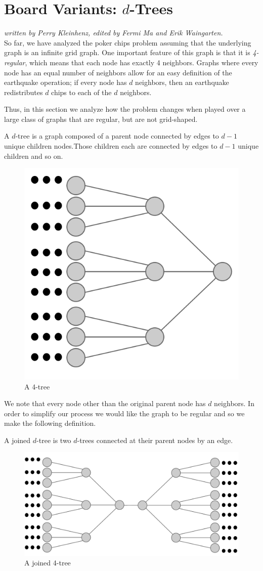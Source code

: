 \documentclass[runningheads,a4paper]{llncs}
\begin{document}
\section{Board Variants: $d$-Trees}
\label{Board Variants: d-Trees}
\emph{written by Perry Kleinhenz, edited by Fermi Ma and Erik Waingarten.}\\

So far, we have analyzed the poker chips problem assuming that the underlying graph is an infinite grid graph. One important feature of this graph is that it is \emph{4-regular}, which means that each node has exactly 4 neighbors. Graphs where every node has an equal number of neighbors allow for an easy definition of the earthquake operation; if every node has $d$ neighbors, then an earthquake redistributes $d$ chips to each of the $d$ neighbors.

Thus, in this section we analyze how the problem changes when played over a large class of graphs that are regular, but are not grid-shaped.

\begin{definition}
A $d$-tree is a graph composed of a parent node connected by edges to $d-1$ unique children nodes.Those children each are connected by edges to $d-1$ unique children and so on.  
\end{definition}
\begin{figure}[!h]
\label{4tree}
\centering
\includegraphics[width=0.4\linewidth]{4tree}
\caption{A 4-tree}
\end{figure}
We note that every node other than the original parent node has $d$ neighbors. In order to simplify our process we would like the graph to be regular and so we make the following definition. 
\begin{definition}
A joined $d$-tree is two $d$-trees connected at their parent nodes by an edge.
\end{definition}
\begin{figure}[!h]
\label{joined4tree}
\centering
\includegraphics[width=0.8\linewidth]{joined4tree}
\caption{A joined 4-tree}
\end{figure}
\end{document}
